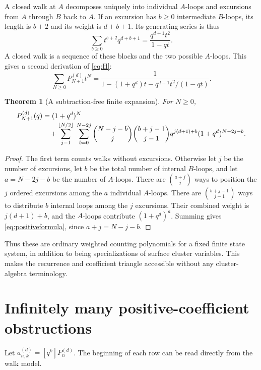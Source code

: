 \documentclass[11pt,letterpaper]{article}
\numberwithin{equation}{section}
\newtheorem{theorem}{Theorem}[section]
\theoremstyle{definition}
\begin{document}
A closed walk at $A$ decomposes uniquely into individual $A$-loops and
excursions from $A$ through $B$ back to $A$. If an excursion has $b\geq0$
intermediate $B$-loops, its length is $b+2$ and its weight is $d+b+1$.
Its generating series is thus
\[
 \sum_{b\geq0}t^{b+2}q^{d+b+1}
 =\frac{q^{d+1}t^2}{1-qt}.
\]
A closed walk is a sequence of these blocks and the two possible $A$-loops.
This gives a second derivation of \eqref{eq:H}:
\begin{equation}\label{eq:excursionGF}
 \sum_{N\geq0}P_{N+1}^{(d)}t^N
 =\frac{1}{1-(1+q^d)t-q^{d+1}t^2/(1-qt)}.
\end{equation}

\begin{theorem}[A subtraction-free finite expansion]\label{thm:finite}
For $N\geq0$,
\begin{align}\label{eq:positiveformula}
 P_{N+1}^{(d)}(q)
 &=(1+q^d)^N\\[-0.2em]
 &\quad+\sum_{j=1}^{\lfloor N/2\rfloor}\;
  \sum_{b=0}^{N-2j}
  \binom{N-j-b}{j}\binom{b+j-1}{j-1}
  q^{j(d+1)+b}(1+q^d)^{N-2j-b}.\notag
\end{align}
\end{theorem}
\begin{proof}
The first term counts walks without excursions. Otherwise let $j$ be the
number of excursions, let $b$ be the total number of internal $B$-loops,
and let $a=N-2j-b$ be the number of $A$-loops. There are
$\binom{a+j}{j}$ ways to position the $j$ ordered excursions among the $a$
individual $A$-loops. There are $\binom{b+j-1}{j-1}$ ways to distribute $b$
internal loops among the $j$ excursions. Their combined weight is
$j(d+1)+b$, and the $A$-loops contribute $(1+q^d)^a$. Summing gives
\eqref{eq:positiveformula}, since $a+j=N-j-b$.
\end{proof}

Thus these are ordinary weighted counting polynomials for a fixed finite
state system, in addition to being specializations of surface cluster
variables. This makes the recurrence and coefficient triangle accessible
without any cluster-algebra terminology.

\section{Infinitely many positive-coefficient obstructions}\label{sec:low}

Let $a_{n,k}^{(d)}=[q^k]P_n^{(d)}$. The beginning of each row can be read
directly from the walk model.
\end{document}
